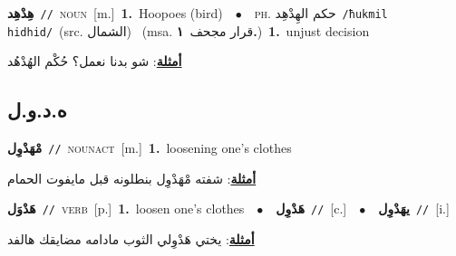 \documentclass[10pt,a4paper,twoside]{article} %
\begin{document}
\begin{multicols}{2}
{\setlength\topsep{0pt}\textbf{\foreignlanguage{arabic}{هِدْهِد}}\ {\color{gray}\texttt{//}\color{black}}\ \textsc{noun}\ [m.]\ \textbf{1.}~Hoopoes (bird)\ \ $\bullet$\ \ \textsc{ph.} \color{gray} \foreignlanguage{arabic}{حكم الهِدْهِد}\color{black}\ {\color{gray}\texttt{/{\sffamily ħukmil hidhid}/}\color{black}}\ \color{gray}(src. \foreignlanguage{arabic}{الشمال})\color{black}\ \color{gray} (msa. \foreignlanguage{arabic}{قرار مجحف}~\foreignlanguage{arabic}{\textbf{١.}})\color{black}\ \textbf{1.}~unjust decision\  \begin{flushright}\color{gray}\foreignlanguage{arabic}{\textbf{\underline{\foreignlanguage{arabic}{أمثلة}}}: شو بدنا نعمل؟ حُكْم الهُدْهُد}\end{flushright}\color{black}} \vspace{2mm}

\vspace{-3mm}
\subsection*{\color{blue}\foreignlanguage{arabic}{ه.د.و.ل}\color{blue}{}} 

{\setlength\topsep{0pt}\textbf{\foreignlanguage{arabic}{مْهَدْوِل}}\ {\color{gray}\texttt{//}\color{black}}\ \textsc{noun\textunderscore act}\ [m.]\ \textbf{1.}~loosening one's clothes\  \begin{flushright}\color{gray}\foreignlanguage{arabic}{\textbf{\underline{\foreignlanguage{arabic}{أمثلة}}}: شفته مْهَدْوِل بنطلونه قبل مايفوت الحمام}\end{flushright}\color{black}} \vspace{2mm}

{\setlength\topsep{0pt}\textbf{\foreignlanguage{arabic}{هَدْوَل}}\ {\color{gray}\texttt{//}\color{black}}\ \textsc{verb}\ [p.]\ \textbf{1.}~loosen one's clothes\ \ $\bullet$\ \ \setlength\topsep{0pt}\textbf{\foreignlanguage{arabic}{هَدْوِل}}\ {\color{gray}\texttt{//}\color{black}}\ [c.]\ \ $\bullet$\ \ \setlength\topsep{0pt}\textbf{\foreignlanguage{arabic}{يهَدْوِل}}\ {\color{gray}\texttt{//}\color{black}}\ [i.]\  \begin{flushright}\color{gray}\foreignlanguage{arabic}{\textbf{\underline{\foreignlanguage{arabic}{أمثلة}}}: يختي هَدْوِلي الثوب مادامه مضايقك هالفد}\end{flushright}\color{black}} \vspace{2mm}


\end{multicols}
\end{document}
